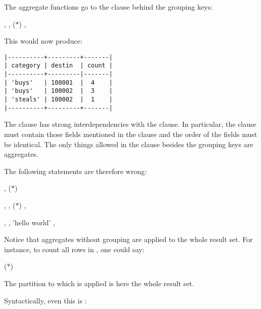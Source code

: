 The aggregate functions go to the  clause
behind the grouping keys:

 ,
                 ,
                 ($\ast$)
 
 , 

This would now produce:

\begin{minipage}{\textwidth}
\begin{verbatim}
|----------+---------+-------|
| category | destin  | count |
|----------+---------|-------|
| 'buys'   | 100001  |  4    |
| 'buys'   | 100002  |  3    |
| 'steals' | 100002  |  1    |
|----------+---------+-------|
\end{verbatim}
\end{minipage}

The  clause has strong interdependencies
with the  clause.
In particular, the  clause must
contain those fields mentioned in the
 clause and the order of the fields
must be identical. The only things allowed in
the  clause besides the grouping keys
are aggregates. 

The following statements are therefore wrong:

 , 
                 ($\ast$)
 
 

 ,
                 , 
                 ($\ast$)
 
 , 

 , 
                 ,
                 'hello world'
 
 , 

Notice that aggregates without grouping
are applied to the whole result set.
For instance, to count all rows in ,
one could say:

 ($\ast$)
 

The partition to which  is applied
is here the whole result set.

Syntactically, even this is :

